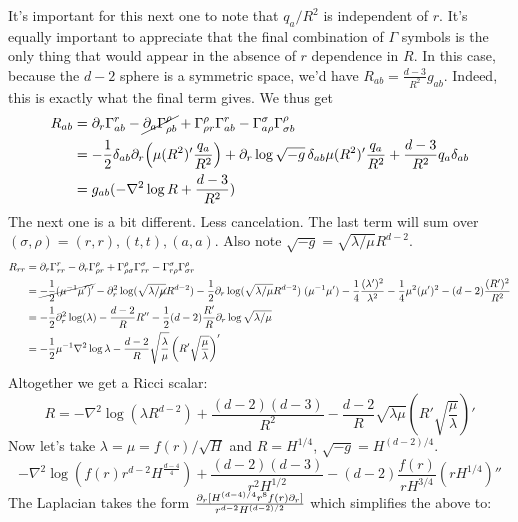 \documentclass[11pt, class=article, crop=false]{standalone}
\begin{document}
\begin{enumerate}
	It's important for this next one to note that $q_a/R^2$ is independent of $r$. It's equally important to appreciate that the final combination of $\Gamma$ symbols is the only thing that would appear in the absence of $r$ dependence in $R$. In this case, because the $d-2$ sphere is a symmetric space, we'd have $R_{ab} = \frac{d-3}{R^2} g_{ab}$. Indeed, this is exactly what the final term gives. We thus get
	\[
	\begin{aligned}
		R_{ab} &= \partial_{r} \Gamma^{r}_{ab} - \cancel{\partial_a \Gamma^{\rho}_{\rho b}} + \Gamma^{\rho}_{\rho r} \Gamma^r_{a b} - \Gamma_{a \rho}^\sigma \Gamma^\rho_{\sigma b} 
		\\ &= -\frac12 \delta_{ab} \partial_r \Big(\mu (R^2)' \frac{q_a}{R^2}\Big) + \partial_r \log \sqrt{-g} \, \delta_{ab} \mu (R^2)' \frac{q_a}{R^2} + \frac{d-3}{R^2} q_a \delta_{ab} \\
		&= g_{ab} (- \nabla^2 \log R  +  \frac{d-3}{R^2}) 
	\end{aligned}
	\]
	The next one is a bit different. Less cancelation. The last term will sum over $(\sigma, \rho) = (r,r), (t,t), (a,a)$. Also note $\sqrt{-g} = \sqrt{\lambda/\mu} R^{d-2}$.
	\[
	\begin{aligned}
		R_{rr} &= \partial_r \Gamma^{r}_{rr} - \partial_r \Gamma^{\rho}_{\rho r} + \Gamma^{\rho}_{\rho \sigma} \Gamma^\sigma_{r r} - \Gamma_{r \rho}^\sigma \Gamma^\rho_{\sigma r} 
		\\ &= \cancel{- \frac12 (\mu^{-1} \mu')'} - \partial_r^2 \log(\sqrt{\lambda/\cancel{\mu}} R^{d-2}) - \frac12 \partial_r \log(\sqrt{\lambda/\mu} R^{d-2})  \; (\mu^{-1} \mu')  -\frac14 \frac{(\lambda')^2}{\lambda^2}  - \frac14 \mu^2 (\mu')^2 - (d-2) \frac{(R')^2}{R^2}\\
		&= - \frac12 \partial_r^2 \log(\lambda) - \frac{d-2}{R} R'' -\frac12 (d-2) \frac{R'}{R} \partial_r \log\sqrt{\lambda/\mu}\\
		&= -\frac12 \mu^{-1} \nabla^2 \log \lambda - \frac{d-2}{R} \sqrt{\frac{\lambda}{\mu}} \left(R' \sqrt{\frac{\mu}{\lambda}} \right)'
	\end{aligned}
	\]
	Altogether we get a Ricci scalar: 
	\[
		R = -\nabla^2 \log(\lambda R^{d-2}) + \frac{(d-2)(d-3)}{R^2} - \frac{d-2}{R} \sqrt{\lambda \mu} \left(R' \sqrt{\frac{\mu}{\lambda}} \right)'
	\]
	Now let's take $\lambda = \mu = f(r)/\sqrt{H}$ and $R = H^{1/4}$, $\sqrt{-g} = H^{(d-2)/4}$. 
	\[
		 -\nabla^2 \log(f(r) r^{d-2} H^{\frac{d-4}{4}}) + \frac{(d-2)(d-3)}{r^2 H^{1/2}} - (d-2) \frac{f(r)}{r H^{3/4}} (r H^{1/4})''
	\]
	The Laplacian takes the form $\frac{\partial_r[ H^{(d-4)/4} r^8 f(r) \partial_r ]}{r^{d-2} H^{(d-2)/2}}$ which simplifies the above to:

\end{enumerate}
\end{document}
